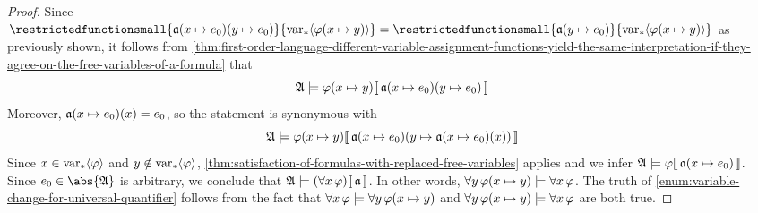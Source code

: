 \begin{proof}
    Since \( \restrictedfunctionsmall{ \folmodifiedvariableassignmentfunction{ \folmodifiedvariableassignmentfunction{\mathfrak{a}}{x}{e_{0}} }{y}{e_{0}}  }{ \folfreevars{ \folfreevariablereplacement{\varphi}{x}{y} } }
        = \restrictedfunctionsmall{ \folmodifiedvariableassignmentfunction{\mathfrak{a}}{y}{e_{0}} }{ \folfreevars{ \folfreevariablereplacement{\varphi}{x}{y} } }\) as previously
    shown, it follows from \cref{thm:first-order-language-different-variable-assignment-functions-yield-the-same-interpretation-if-they-agree-on-the-free-variables-of-a-formula} that
    \begin{equation*}
        \folwffsatisfaction{\mathfrak{A}}{ \folfreevariablereplacement{\varphi}{x}{y} }{ \folmodifiedvariableassignmentfunction{ \folmodifiedvariableassignmentfunction{\mathfrak{a}}{x}{e_{0}} }{y}{e_{0}} }
    \end{equation*}
    Moreover, \( \folmodifiedvariableassignmentfunction{\mathfrak{a}}{x}{e_{0}}(x) = e_{0}\), so the statement is synonymous with
    \begin{equation*}
        \folwffsatisfaction{\mathfrak{A}}{ \folfreevariablereplacement{\varphi}{x}{y} }{ \folmodifiedvariableassignmentfunction{ \folmodifiedvariableassignmentfunction{\mathfrak{a}}{x}{e_{0}} }{y}{ \folmodifiedvariableassignmentfunction{\mathfrak{a}}{x}{e_{0}}(x) } }
    \end{equation*}
    Since \( x \in \operatorname{var}_{\ast} \langle\varphi\rangle \) and \( y \notin \operatorname{var}_{\ast} \langle\varphi\rangle \), \cref{thm:satisfaction-of-formulas-with-replaced-free-variables} applies and we infer
    \( \folwffsatisfaction{\mathfrak{A}}{\varphi}{ \folmodifiedvariableassignmentfunction{\mathfrak{a}}{x}{e_{0}} } \).
    Since \( e_{0} \in \abs{\mathfrak{A}} \) is arbitrary, we conclude that \( \folwffsatisfaction{\mathfrak{A}}{\mleft( \forall x \, \varphi \mright)}{\mathfrak{a}} \).
    In other words, \( \forall y \, \folfreevariablereplacement{\varphi}{x}{y} \models \forall x \, \varphi \).
    The truth of \ref{enum:variable-change-for-universal-quantifier} follows from the fact that \( \forall x \, \varphi \models \forall y \, \folfreevariablereplacement{\varphi}{x}{y} \) and \( \forall y \, \folfreevariablereplacement{\varphi}{x}{y} \models \forall x \, \varphi \) are both true.


\end{proof}
